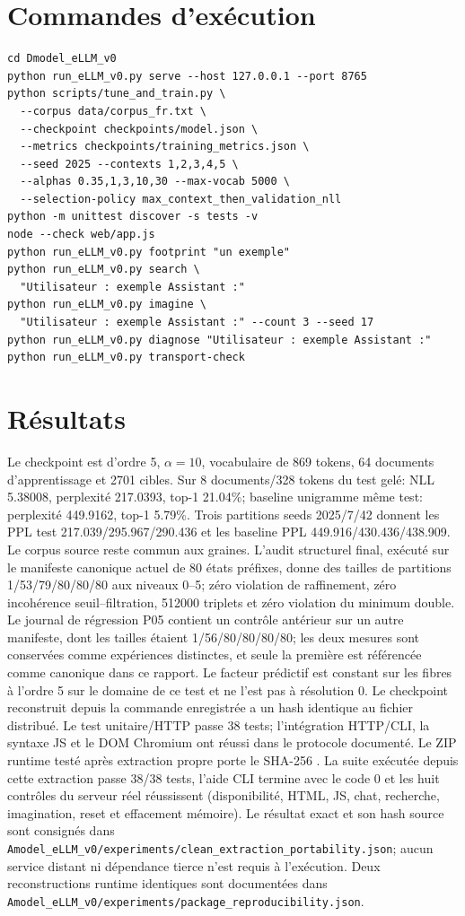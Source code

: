 \documentclass[11pt,a4paper]{article}
\begin{document}
\section{Commandes d'exécution}
\begin{verbatim}
cd Dmodel_eLLM_v0
python run_eLLM_v0.py serve --host 127.0.0.1 --port 8765
python scripts/tune_and_train.py \
  --corpus data/corpus_fr.txt \
  --checkpoint checkpoints/model.json \
  --metrics checkpoints/training_metrics.json \
  --seed 2025 --contexts 1,2,3,4,5 \
  --alphas 0.35,1,3,10,30 --max-vocab 5000 \
  --selection-policy max_context_then_validation_nll
python -m unittest discover -s tests -v
node --check web/app.js
python run_eLLM_v0.py footprint "un exemple"
python run_eLLM_v0.py search \
  "Utilisateur : exemple Assistant :"
python run_eLLM_v0.py imagine \
  "Utilisateur : exemple Assistant :" --count 3 --seed 17
python run_eLLM_v0.py diagnose "Utilisateur : exemple Assistant :"
python run_eLLM_v0.py transport-check
\end{verbatim}
\section{Résultats}
Le checkpoint est d'ordre 5, $\alpha=10$, vocabulaire de 869 tokens, 64 documents d'apprentissage et 2701 cibles. Sur 8 documents/328 tokens du test gelé: NLL 5.38008, perplexité 217.0393, top-1 21.04\%; baseline unigramme même test: perplexité 449.9162, top-1 5.79\%. Trois partitions seeds 2025/7/42 donnent les PPL test 217.039/295.967/290.436 et les baseline PPL 449.916/430.436/438.909. Le corpus source reste commun aux graines.
L’audit structurel final, exécuté sur le manifeste canonique actuel de 80 états préfixes, donne des tailles de partitions 1/53/79/80/80/80 aux niveaux 0--5; zéro violation de raffinement, zéro incohérence seuil--filtration, 512000 triplets et zéro violation du minimum double. Le journal de régression P05 contient un contrôle antérieur sur un autre manifeste, dont les tailles étaient 1/56/80/80/80/80; les deux mesures sont conservées comme expériences distinctes, et seule la première est référencée comme canonique dans ce rapport. Le facteur prédictif est constant sur les fibres à l'ordre 5 sur le domaine de ce test et ne l'est pas à résolution 0. Le checkpoint reconstruit depuis la commande enregistrée a un hash identique au fichier distribué. Le test unitaire/HTTP passe 38 tests; l'intégration HTTP/CLI, la syntaxe JS et le DOM Chromium ont réussi dans le protocole documenté. Le ZIP runtime testé après extraction propre porte le SHA-256 \texttt{}. La suite exécutée depuis cette extraction passe 38/38 tests, l'aide CLI termine avec le code 0 et les huit contrôles du serveur réel réussissent (disponibilité, HTML, JS, chat, recherche, imagination, reset et effacement mémoire). Le résultat exact et son hash source sont consignés dans \texttt{Amodel\_eLLM\_v0/experiments/clean\_extraction\_portability.json}; aucun service distant ni dépendance tierce n'est requis à l'exécution. Deux reconstructions runtime identiques sont documentées dans \texttt{Amodel\_eLLM\_v0/experiments/package\_reproducibility.json}.
\end{document}
